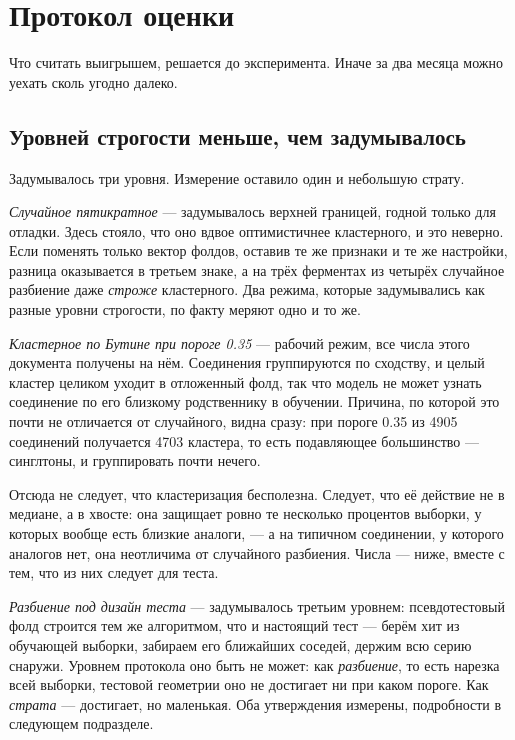 \section{Протокол оценки}
\label{sec:proto}

Что считать выигрышем, решается до эксперимента. Иначе за два месяца можно уехать сколь угодно далеко.

\subsection{Уровней строгости меньше, чем задумывалось}

Задумывалось три уровня. Измерение оставило один и небольшую страту.

\emph{Случайное пятикратное} --- задумывалось верхней границей, годной только для отладки. Здесь
стояло, что оно вдвое оптимистичнее кластерного, и это неверно. Если поменять только вектор
фолдов, оставив те же признаки и те же настройки, разница оказывается в третьем знаке, а на
трёх ферментах из четырёх случайное разбиение даже \emph{строже} кластерного. Два режима,
которые задумывались как разные уровни строгости, по факту меряют одно и то же.

\emph{Кластерное по Бутине при пороге 0.35} --- рабочий режим, все числа этого документа получены на нём.
Соединения группируются по сходству, и целый кластер целиком уходит в отложенный фолд, так что модель
не может узнать соединение по его близкому родственнику в обучении. Причина, по которой это почти не
отличается от случайного, видна сразу: при пороге 0.35 из 4905 соединений получается 4703 кластера, то
есть подавляющее большинство --- синглтоны, и группировать почти нечего.

Отсюда не следует, что кластеризация бесполезна. Следует, что её действие не в медиане, а в
хвосте: она защищает ровно те несколько процентов выборки, у которых вообще есть близкие
аналоги, --- а на типичном соединении, у которого аналогов нет, она неотличима от случайного
разбиения. Числа --- ниже, вместе с тем, что из них следует для теста.

\emph{Разбиение под дизайн теста} --- задумывалось третьим уровнем: псевдотестовый фолд строится тем же
алгоритмом, что и настоящий тест --- берём хит из обучающей выборки, забираем его ближайших соседей,
держим всю серию снаружи. Уровнем протокола оно быть не может: как \emph{разбиение}, то есть нарезка
всей выборки, тестовой геометрии оно не достигает ни при каком пороге. Как \emph{страта} --- достигает,
но маленькая. Оба утверждения измерены, подробности в следующем подразделе.

